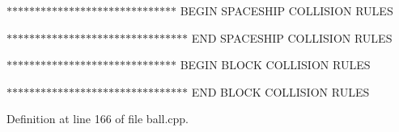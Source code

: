 $\ast$$\ast$$\ast$$\ast$$\ast$$\ast$$\ast$$\ast$$\ast$$\ast$$\ast$$\ast$$\ast$$\ast$$\ast$$\ast$$\ast$$\ast$$\ast$$\ast$$\ast$$\ast$$\ast$$\ast$$\ast$$\ast$$\ast$$\ast$$\ast$$\ast$ BEGIN SPACESHIP COLLISION RULES

$\ast$$\ast$$\ast$$\ast$$\ast$$\ast$$\ast$$\ast$$\ast$$\ast$$\ast$$\ast$$\ast$$\ast$$\ast$$\ast$$\ast$$\ast$$\ast$$\ast$$\ast$$\ast$$\ast$$\ast$$\ast$$\ast$$\ast$$\ast$$\ast$$\ast$$\ast$$\ast$ END SPACESHIP COLLISION RULES

$\ast$$\ast$$\ast$$\ast$$\ast$$\ast$$\ast$$\ast$$\ast$$\ast$$\ast$$\ast$$\ast$$\ast$$\ast$$\ast$$\ast$$\ast$$\ast$$\ast$$\ast$$\ast$$\ast$$\ast$$\ast$$\ast$$\ast$$\ast$$\ast$$\ast$ BEGIN BLOCK COLLISION RULES

$\ast$$\ast$$\ast$$\ast$$\ast$$\ast$$\ast$$\ast$$\ast$$\ast$$\ast$$\ast$$\ast$$\ast$$\ast$$\ast$$\ast$$\ast$$\ast$$\ast$$\ast$$\ast$$\ast$$\ast$$\ast$$\ast$$\ast$$\ast$$\ast$$\ast$$\ast$$\ast$ END BLOCK COLLISION RULES

Definition at line 166 of file ball.cpp.



